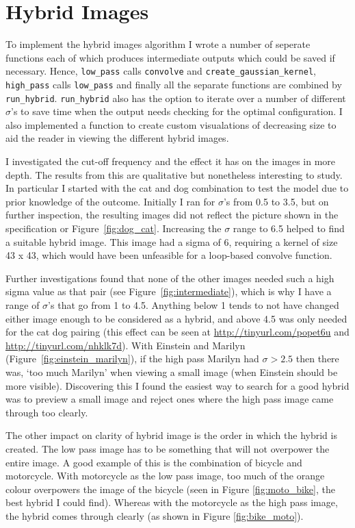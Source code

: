 \documentclass[a4paper,10pt]{article}
\begin{document}
\section{Hybrid Images}
To implement the hybrid images algorithm I wrote a number of seperate
functions each of which produces intermediate outputs which could be
saved if necessary. Hence, \lstinline|low_pass| calls \lstinline|convolve| and
\lstinline|create_gaussian_kernel|, \lstinline|high_pass| calls \lstinline|low_pass|
and finally all the separate functions are combined by \lstinline|run_hybrid|.
\lstinline|run_hybrid| also has the option to iterate over a number of different
$\sigma$'s to save time when the output needs checking for the optimal
configuration. I also implemented a function to create custom visualations of
decreasing size to aid the reader in viewing the different hybrid images.

I investigated the cut-off frequency and the effect it has on the images in more
depth. The results from this are qualitative but nonetheless
interesting to study. In particular I started with the cat and dog combination
to test the model due to prior knowledge of the outcome. Initially I ran for $\sigma$'s
from 0.5 to 3.5, but on further inspection, the resulting images did not
reflect the picture shown in the specification or Figure~\ref{fig:dog_cat}.
Increasing the $\sigma$ range to 6.5 helped to find a suitable hybrid image.
This image had a sigma of 6, requiring a kernel of size 43 x 43, which would
have been unfeasible for a loop-based convolve function.

Further investigations found that none of the other images needed
such a high sigma value as that pair (see Figure~\ref{fig:intermediate}), which is
why I have a range of $\sigma$'s
that go from 1 to 4.5. Anything below 1 tends to not have changed either image
enough to be considered as a hybrid, and above 4.5 was only needed for the cat
dog pairing (this effect can be seen at \url{http://tinyurl.com/popet6u} and
\url{http://tinyurl.com/nhklk7d}). With Einstein and Marilyn
(Figure~\ref{fig:einstein_marilyn}), if
the high pass Marilyn had $\sigma > 2.5$ then there was, `too much
Marilyn' when viewing a small image (when Einstein should be more visible).
Discovering this I found the easiest way to search for a good hybrid was to
preview a small image and reject ones where the high pass image came through too
clearly.

The other impact on clarity of hybrid image is the order in which the hybrid is
created. The low pass image has to be something that will not overpower the
entire image. A good example of this is the combination of bicycle and motorcycle.
With motorcycle as the low pass image, too much of the orange colour overpowers
the image of the bicycle (seen in Figure \ref{fig:moto_bike}, the best hybrid I
could find). Whereas with the motorcycle as the high pass image, the hybrid
comes through clearly (as shown in Figure \ref{fig:bike_moto}).
\end{document}

